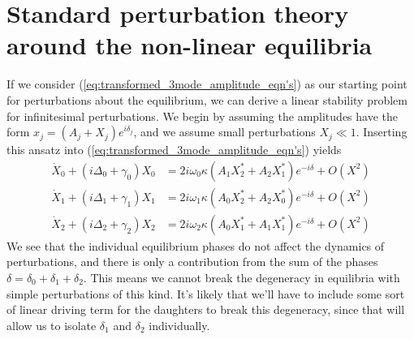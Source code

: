 \section*{Standard perturbation theory around the non-linear equilibria}

If we consider (\ref{eq:transformed_3mode_amplitude_eqn's}) as our starting point for perturbations about the equilibrium, we can derive a linear stability problem for infinitesimal perturbations. We begin by assuming the amplitudes have the form $x_j = (A_j + X_j) e^{i\delta_j} $, and we assume small perturbations $X_j \ll 1$. Inserting this ansatz into (\ref{eq:transformed_3mode_amplitude_eqn's}) yields
\begin{subequations}
\begin{align}
\dot{X}_0 + (i\Delta_0 + \gamma_0)X_0 & = 2i\omega_0\kappa(A_1 X_2^\ast + A_2 X_1^\ast) e^{-i\delta} + O(X^2) \\
\dot{X}_1 + (i\Delta_1 + \gamma_1)X_1 & = 2i\omega_1\kappa(A_0 X_2^\ast + A_2 X_0^\ast) e^{-i\delta} + O(X^2) \\
\dot{X}_2 + (i\Delta_2 + \gamma_2)X_2 & = 2i\omega_2\kappa(A_0 X_1^\ast + A_1 X_1^\ast) e^{-i\delta} + O(X^2)
\end{align}
\end{subequations}
We see that the individual equilibrium phases do not affect the dynamics of perturbations, and there is only a contribution from the sum of the phases $\delta = \delta_0 + \delta_1 + \delta_2$. This means we cannot break the degeneracy in equilibria with simple perturbations of this kind. It's likely that we'll have to include some sort of linear driving term for the daughters to break this degeneracy, since that will allow us to isolate $\delta_1$ and $\delta_2$ individually.

